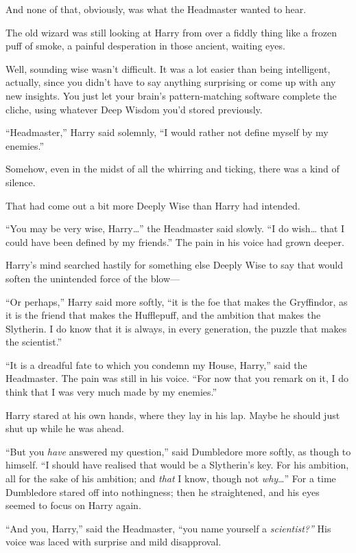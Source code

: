 And none of that, obviously, was what the Headmaster wanted to hear.

The old wizard was still looking at Harry from over a fiddly thing like
a frozen puff of smoke, a painful desperation in those ancient, waiting
eyes.

Well, sounding wise wasn't difficult. It was a lot easier than being
intelligent, actually, since you didn't have to say anything surprising
or come up with any new insights. You just let your brain's
pattern-matching software complete the cliche, using whatever Deep
Wisdom you'd stored previously.

``Headmaster,'' Harry said solemnly, ``I would rather not define myself
by my enemies.''

Somehow, even in the midst of all the whirring and ticking, there was a
kind of silence.

That had come out a bit more Deeply Wise than Harry had intended.

``You may be very wise, Harry\ldots{}'' the Headmaster said slowly. ``I
do wish\ldots{} that I could have been defined by my friends.'' The pain
in his voice had grown deeper.

Harry's mind searched hastily for something else Deeply Wise to say that
would soften the unintended force of the blow---

``Or perhaps,'' Harry said more softly, ``it is the foe that makes the
Gryffindor, as it is the friend that makes the Hufflepuff, and the
ambition that makes the Slytherin. I do know that it is always, in every
generation, the puzzle that makes the scientist.''

``It is a dreadful fate to which you condemn my House, Harry,'' said the
Headmaster. The pain was still in his voice. ``For now that you remark
on it, I do think that I was very much made by my enemies.''

Harry stared at his own hands, where they lay in his lap. Maybe he
should just shut up while he was ahead.

``But you \emph{have} answered my question,'' said Dumbledore more
softly, as though to himself. ``I should have realised that would be a
Slytherin's key. For his ambition, all for the sake of his ambition; and
\emph{that} I know, though not \emph{why}\ldots{}'' For a time
Dumbledore stared off into nothingness; then he straightened, and his
eyes seemed to focus on Harry again.

``And you, Harry,'' said the Headmaster, ``you name yourself a
\emph{scientist?''} His voice was laced with surprise and mild
disapproval.

